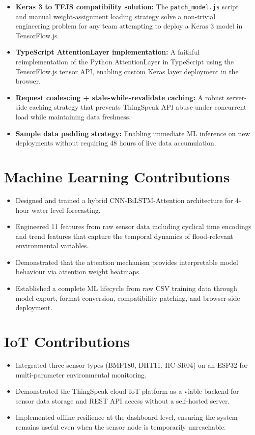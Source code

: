 \begin{itemize}[leftmargin=1.5em]
  \item \textbf{Keras 3 to TFJS compatibility solution:} The \texttt{patch\_\allowbreak{}model.\allowbreak{}js} script and manual weight-assignment loading strategy solve a non-trivial engineering problem for any team attempting to deploy a Keras 3 model in TensorFlow.js.
  \item \textbf{TypeScript AttentionLayer implementation:} A faithful reimplementation of the Python AttentionLayer in TypeScript using the TensorFlow.js tensor API, enabling custom Keras layer deployment in the browser.
  \item \textbf{Request coalescing + stale-while-revalidate caching:} A robust server-side caching strategy that prevents ThingSpeak API abuse under concurrent load while maintaining data freshness.
  \item \textbf{Sample data padding strategy:} Enabling immediate ML inference on new deployments without requiring 48 hours of live data accumulation.
\end{itemize}

\section{Machine Learning Contributions}

\begin{itemize}[leftmargin=1.5em]
  \item Designed and trained a hybrid CNN-BiLSTM-Attention architecture for 4-hour water level forecasting.
  \item Engineered 11 features from raw sensor data including cyclical time encodings and trend features that capture the temporal dynamics of flood-relevant environmental variables.
  \item Demonstrated that the attention mechanism provides interpretable model behaviour via attention weight heatmaps.
  \item Established a complete ML lifecycle from raw CSV training data through model export, format conversion, compatibility patching, and browser-side deployment.
\end{itemize}

\section{IoT Contributions}

\begin{itemize}[leftmargin=1.5em]
  \item Integrated three sensor types (BMP180, DHT11, HC-SR04) on an ESP32 for multi-parameter environmental monitoring.
  \item Demonstrated the ThingSpeak cloud IoT platform as a viable backend for sensor data storage and REST API access without a self-hosted server.
  \item Implemented offline resilience at the dashboard level, ensuring the system remains useful even when the sensor node is temporarily unreachable.
\end{itemize}

